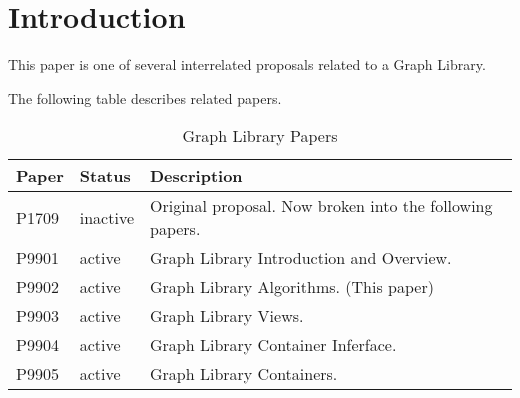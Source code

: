 \chapter{Introduction}

This paper is one of several interrelated proposals related to a Graph Library.

The following table describes related papers.

\begin{table}[h!]
    \begin{center}
    {\begin{tabular}{l l p{7cm}}
       \hline
       \textbf{Paper}     & \textbf{Status} & \textbf{Description}                                                                                                                                                                             \\
       \hline
       P1709              & inactive       & Original proposal. Now broken into the following papers. \\
       \hline
       P9901              & active         & Graph Library Introduction and Overview. \\
       P9902              & active         & Graph Library Algorithms. (This paper) \\
       P9903              & active         & Graph Library Views. \\
       P9904              & active         & Graph Library Container Inferface.\\
       P9905              & active         & Graph Library Containers.\\
       \hline
    \end{tabular}}
      \caption{Graph Library Papers}
      \label{tab:papers}
    \end{center}
  \end{table}
  
